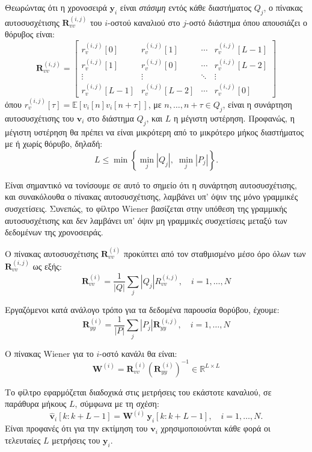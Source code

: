 \documentclass[a4paper,12pt]{article}
\begin{document}
Θεωρώντας ότι η χρονοσειρά $\mathbf{y}_i$ είναι \textit{στάσιμη} εντός κάθε διαστήματος $Q_j$, ο πίνακας
αυτοσυσχέτισης $\mathbf{R}_{vv}^{(i,j)}$ του $i$-οστού καναλιού στο $j$-οστό διάστημα όπου απουσιάζει ο 
θόρυβος είναι:
\[
    \mathbf{R}_{vv}^{(i,j)} = 
    \begin{bmatrix}
    r_v^{(i,j)}[0] & r_v^{(i,j)}[1] & \cdots & r_v^{(i,j)}[L-1] \\
    r_v^{(i,j)}[1] & r_v^{(i,j)}[0] & \cdots & r_v^{(i,j)}[L-2] \\
    \vdots & \vdots & \ddots & \vdots \\
    r_v^{(i,j)}[L-1] & r_v^{(i,j)}[L-2] & \cdots & r_v^{(i,j)}[0]
    \end{bmatrix}
\]
όπου $r_v^{(i,j)}[\tau] = \mathbb{E}[v_i[n] v_i[n + \tau]]$, με $n, \ldots, n + \tau \in Q_j$, είναι η 
συνάρτηση αυτοσυσχέτισης του $\mathbf{v}_i$ στο διάστημα $Q_j$, και $L$ η μέγιστη υστέρηση. Προφανώς, 
η μέγιστη υστέρηση θα πρέπει να είναι μικρότερη από το μικρότερο μήκος διαστήματος με ή χωρίς θόρυβο, 
δηλαδή:
\[
L \leq \min\left\{ \underset{j}{\min} |Q_j|, \; \underset{j}{\min} |P_j| \right\}.
\]

Είναι σημαντικό να τονίσουμε σε αυτό το σημείο ότι η συνάρτηση αυτοσυσχέτισης, και συνακόλουθα ο πίνακας 
αυτοσυσχέτισης, λαμβάνει υπ’ όψιν της μόνο γραμμικές συσχετίσεις. Συνεπώς, το φίλτρο 
Wiener βασίζεται στην υπόθεση της γραμμικής αυτοσυσχέτισης και 
δεν λαμβάνει υπ’ όψιν μη γραμμικές συσχετίσεις μεταξύ των δεδομένων της χρονοσειράς.

Ο πίνακας αυτοσυσχέτισης $\mathbf{R}_{vv}^{(i)}$ προκύπτει από τον σταθμισμένο μέσο όρο όλων των 
$\mathbf{R}_{vv}^{(i,j)}$ ως εξής:
\[
\mathbf{R}_{vv}^{(i)} = \frac{1}{|Q|}\sum_{j}|Q_j|R_{vv}^{(i,j)}, \quad i=1,\ldots,N
\]

Εργαζόμενοι κατά ανάλογο τρόπο για τα δεδομένα παρουσία θορύβου, έχουμε:
\[
\mathbf{R}_{yy}^{(i)} = \frac{1}{|P|}\sum_{j}|P_j|\mathbf{R}_{yy}^{(i,j)}, \quad i=1,\ldots,N
\]

Ο πίνακας Wiener για το $i$-οστό κανάλι θα είναι:
\[
\mathbf{W}^{(i)} = \mathbf{R}_{vv}^{(i)}\left(\mathbf{R}_{yy}^{(i)}\right)^{-1} \in \mathbb{R}^{L \times L}
\]

Το φίλτρο εφαρμόζεται διαδοχικά στις μετρήσεις του εκάστοτε καναλιού, σε παράθυρα μήκους $L$, σύμφωνα με 
τη σχέση:
\[
\hat{\mathbf{v}}_i[k : k + L - 1] = \mathbf{W}^{(i)} \, \mathbf{y}_i[k : k + L - 1], \quad i = 1, \ldots, N.
\]
Είναι προφανές ότι για την εκτίμηση του $\mathbf{v}_i$ χρησιμοποιούνται κάθε φορά οι τελευταίες $L$ 
μετρήσεις του $\mathbf{y}_i$.
\end{document}
